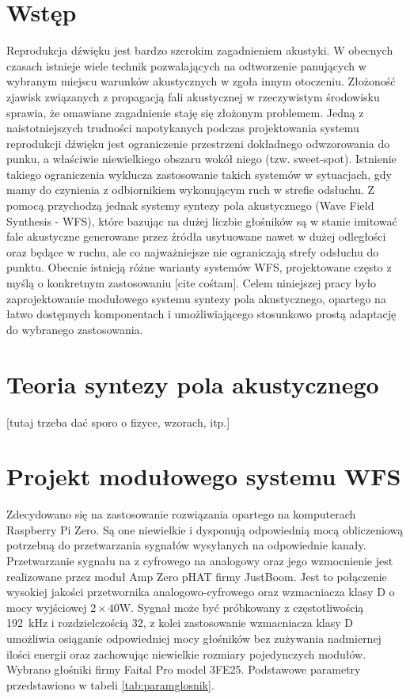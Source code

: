 \documentclass[12pt]{oska}
\affiliation{Akademia Górniczo-Hutnicza im. Stanisława Staszica w Krakowie}
\begin{document}
\maketitles

\section{Wstęp}

Reprodukcja dźwięku jest bardzo szerokim zagadnieniem akustyki. W obecnych
czasach istnieje wiele technik pozwalających na odtworzenie panujących w
wybranym miejscu warunków akustycznych w zgoła innym otoczeniu. Złożoność
zjawisk związanych z propagacją fali akustycznej w rzeczywistym środowisku
sprawia, że omawiane zagadnienie staję się złożonym problemem. Jedną z
naistotniejszych trudności napotykanych podczas projektowania systemu
reprodukcji dźwięku jest ograniczenie przestrzeni dokładnego odwzorowania do
punku, a właściwie niewielkiego obszaru wokół niego (tzw. sweet-spot).
Istnienie takiego ograniczenia wyklucza zastosowanie takich systemów w
sytuacjach, gdy mamy do czynienia z odbiornikiem wykonującym ruch w strefie
odsłuchu. Z pomocą przychodzą jednak systemy syntezy pola akustycznego (Wave
Field Synthesis - WFS), które bazując na dużej liczbie głośników są w stanie
imitować fale akustyczne generowane przez źródła usytuowane nawet w dużej
odległości oraz będące w ruchu, ale co najważniejsze nie ograniczają strefy
odsłuchu do punktu. Obecnie istnieją różne warianty systemów WFS, projektowane
często z myślą o konkretnym zastosowaniu [cite cośtam]. Celem niniejszej pracy
było zaprojektowanie modułowego systemu syntezy pola akustycznego, opartego na
łatwo dostępnych komponentach i umożliwiającego stosunkowo prostą adaptację do
wybranego zastosowania.

\section{Teoria syntezy pola akustycznego}

[tutaj trzeba dać sporo o fizyce, wzorach, itp.]

\section{Projekt modułowego systemu WFS}

Zdecydowano się na zastosowanie rozwiązania opartego na komputerach Raspberry
Pi Zero. Są one niewielkie i dysponują odpowiednią mocą obliczeniową potrzebną
do przetwarzania sygnałów wysyłanych na odpowiednie kanały. Przetwarzanie
sygnału na z cyfrowego na analogowy oraz jego wzmocnienie jest realizowane
przez moduł Amp Zero pHAT firmy JustBoom. Jest to połączenie wysokiej jakości
przetwornika analogowo-cyfrowego oraz wzmacniacza klasy D o mocy wyjściowej
$2\times40\si{\watt}$. Sygnał może być próbkowany z częstotliwością
\SI{192}{\kilo\hertz} i rozdzielczością \SI{32}{\bit}, z kolei zastosowanie
wzmacniacza klasy D umożliwia osiąganie odpowiedniej mocy głośników bez
zużywania nadmiernej ilości energii oraz zachowując niewielkie rozmiary
pojedynczych modułów. 
Wybrano głośniki firmy Faital Pro model 3FE25. Podstawowe parametry
przedstawiono w tabeli \ref{tab:paramglosnik}.
\end{document}
